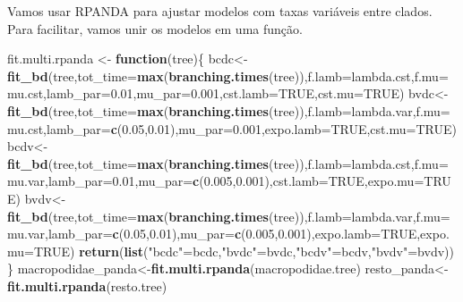 \documentclass[
]{book}
\newenvironment{Shaded}{\begin{snugshade}}{\end{snugshade}}
\newcommand{\AttributeTok}[1]{\textcolor[rgb]{0.13,0.29,0.53}{#1}}
\newcommand{\ConstantTok}[1]{\textcolor[rgb]{0.56,0.35,0.01}{#1}}
\newcommand{\ControlFlowTok}[1]{\textcolor[rgb]{0.13,0.29,0.53}{\textbf{#1}}}
\newcommand{\FloatTok}[1]{\textcolor[rgb]{0.00,0.00,0.81}{#1}}
\newcommand{\FunctionTok}[1]{\textcolor[rgb]{0.13,0.29,0.53}{\textbf{#1}}}
\newcommand{\NormalTok}[1]{#1}
\newcommand{\OtherTok}[1]{\textcolor[rgb]{0.56,0.35,0.01}{#1}}
\newcommand{\StringTok}[1]{\textcolor[rgb]{0.31,0.60,0.02}{#1}}
\begin{document}
Vamos usar RPANDA para ajustar modelos com taxas variáveis entre clados.
Para facilitar, vamos unir os modelos em uma função.

\begin{Shaded}
\begin{Highlighting}[]
\NormalTok{fit.multi.rpanda }\OtherTok{\textless{}{-}} \ControlFlowTok{function}\NormalTok{(tree)\{}
\NormalTok{ bcdc}\OtherTok{\textless{}{-}}\FunctionTok{fit\_bd}\NormalTok{(tree,}\AttributeTok{tot\_time=}\FunctionTok{max}\NormalTok{(}\FunctionTok{branching.times}\NormalTok{(tree)),}\AttributeTok{f.lamb=}\NormalTok{lambda.cst,}\AttributeTok{f.mu=}\NormalTok{mu.cst,}\AttributeTok{lamb\_par=}\FloatTok{0.01}\NormalTok{,}\AttributeTok{mu\_par=}\FloatTok{0.001}\NormalTok{,}\AttributeTok{cst.lamb=}\ConstantTok{TRUE}\NormalTok{,}\AttributeTok{cst.mu=}\ConstantTok{TRUE}\NormalTok{)}
\NormalTok{ bvdc}\OtherTok{\textless{}{-}}\FunctionTok{fit\_bd}\NormalTok{(tree,}\AttributeTok{tot\_time=}\FunctionTok{max}\NormalTok{(}\FunctionTok{branching.times}\NormalTok{(tree)),}\AttributeTok{f.lamb=}\NormalTok{lambda.var,}\AttributeTok{f.mu=}\NormalTok{mu.cst,}\AttributeTok{lamb\_par=}\FunctionTok{c}\NormalTok{(}\FloatTok{0.05}\NormalTok{,}\FloatTok{0.01}\NormalTok{),}\AttributeTok{mu\_par=}\FloatTok{0.001}\NormalTok{,}\AttributeTok{expo.lamb=}\ConstantTok{TRUE}\NormalTok{,}\AttributeTok{cst.mu=}\ConstantTok{TRUE}\NormalTok{)}
\NormalTok{ bcdv}\OtherTok{\textless{}{-}}\FunctionTok{fit\_bd}\NormalTok{(tree,}\AttributeTok{tot\_time=}\FunctionTok{max}\NormalTok{(}\FunctionTok{branching.times}\NormalTok{(tree)),}\AttributeTok{f.lamb=}\NormalTok{lambda.cst,}\AttributeTok{f.mu=}\NormalTok{mu.var,}\AttributeTok{lamb\_par=}\FloatTok{0.01}\NormalTok{,}\AttributeTok{mu\_par=}\FunctionTok{c}\NormalTok{(}\FloatTok{0.005}\NormalTok{,}\FloatTok{0.001}\NormalTok{),}\AttributeTok{cst.lamb=}\ConstantTok{TRUE}\NormalTok{,}\AttributeTok{expo.mu=}\ConstantTok{TRUE}\NormalTok{)}
\NormalTok{ bvdv}\OtherTok{\textless{}{-}}\FunctionTok{fit\_bd}\NormalTok{(tree,}\AttributeTok{tot\_time=}\FunctionTok{max}\NormalTok{(}\FunctionTok{branching.times}\NormalTok{(tree)),}\AttributeTok{f.lamb=}\NormalTok{lambda.var,}\AttributeTok{f.mu=}\NormalTok{mu.var,}\AttributeTok{lamb\_par=}\FunctionTok{c}\NormalTok{(}\FloatTok{0.05}\NormalTok{,}\FloatTok{0.01}\NormalTok{),}\AttributeTok{mu\_par=}\FunctionTok{c}\NormalTok{(}\FloatTok{0.005}\NormalTok{,}\FloatTok{0.001}\NormalTok{),}\AttributeTok{expo.lamb=}\ConstantTok{TRUE}\NormalTok{,}\AttributeTok{expo.mu=}\ConstantTok{TRUE}\NormalTok{)}
 \FunctionTok{return}\NormalTok{(}\FunctionTok{list}\NormalTok{(}\StringTok{"bcdc"}\OtherTok{=}\NormalTok{bcdc,}\StringTok{"bvdc"}\OtherTok{=}\NormalTok{bvdc,}\StringTok{"bcdv"}\OtherTok{=}\NormalTok{bcdv,}\StringTok{"bvdv"}\OtherTok{=}\NormalTok{bvdv))}
\NormalTok{ \}}
\NormalTok{macropodidae\_panda}\OtherTok{\textless{}{-}}\FunctionTok{fit.multi.rpanda}\NormalTok{(macropodidae.tree)}
\NormalTok{resto\_panda}\OtherTok{\textless{}{-}}\FunctionTok{fit.multi.rpanda}\NormalTok{(resto.tree)}
\end{Highlighting}
\end{Shaded}
\end{document}
